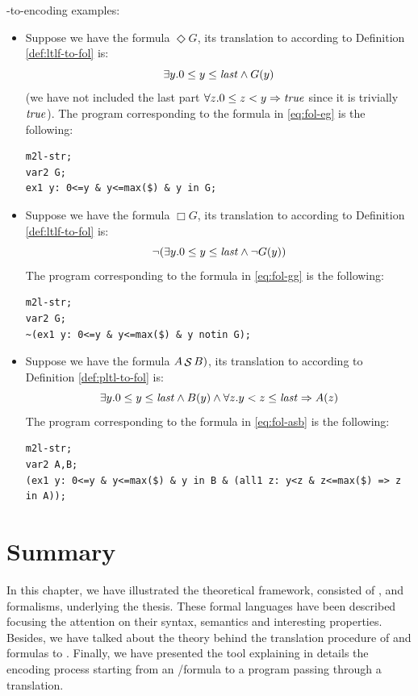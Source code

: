 \begin{example}
\FOL-to-\MONA encoding examples:\\
\begin{itemize}
\item Suppose we have the \LTLf formula $\Diamond G$, its translation to \FOL according to Definition \ref{def:ltlf-to-fol} is:
\begin{equation}\label{eq:fol-eg}
\exists y. 0 \le y \le \mathit{last} \wedge G(y)
\end{equation}
(we have not included the last part $\forall z. 0 \le z < y \Rightarrow \mathit{true}$ since it is trivially $\mathit{true}$).
The \MONA program corresponding to the formula in \ref{eq:fol-eg} is the following:
\begin{lstlisting}[style=mona]
m2l-str;
var2 G;
ex1 y: 0<=y & y<=max($) & y in G;
\end{lstlisting}

\item Suppose we have the \LTLf formula $\Box G$, its translation to \FOL according to Definition \ref{def:ltlf-to-fol} is:
\begin{equation}\label{eq:fol-gg}
\lnot (\exists y. 0 \le y \le \mathit{last} \wedge \lnot G(y))
\end{equation}
The \MONA program corresponding to the formula in \ref{eq:fol-gg} is the following:
\begin{lstlisting}[style=mona]
m2l-str;
var2 G;
~(ex1 y: 0<=y & y<=max($) & y notin G);
\end{lstlisting}

\item Suppose we have the \PLTL formula $A \mathop{\mathcal{S}} B)$, its translation to \FOL according to Definition \ref{def:pltl-to-fol} is:
\begin{equation}\label{eq:fol-asb}
\exists y. 0 \le y \le \mathit{last} \wedge B(y) \wedge \forall z. y < z \le \mathit{last} \Rightarrow A(z)
\end{equation}
The \MONA program corresponding to the formula in \ref{eq:fol-asb} is the following:
\begin{lstlisting}[style=mona]
m2l-str;
var2 A,B;
(ex1 y: 0<=y & y<=max($) & y in B & (all1 z: y<z & z<=max($) => z in A));
\end{lstlisting}
\end{itemize}
\end{example}
\section{Summary}
In this chapter, we have illustrated the theoretical framework, consisted of \LTL, \LTLf and \PLTL formalisms, underlying the thesis. These formal languages have been described focusing the attention on their syntax, semantics and interesting properties. Besides, we have talked about the theory behind the translation procedure of \LTLf and \PLTL formulas to \DFAs. Finally, we have presented the \MONA tool explaining in details the encoding process starting from an \LTLf/\PLTL formula to a \MONA program passing through a \FOL translation.